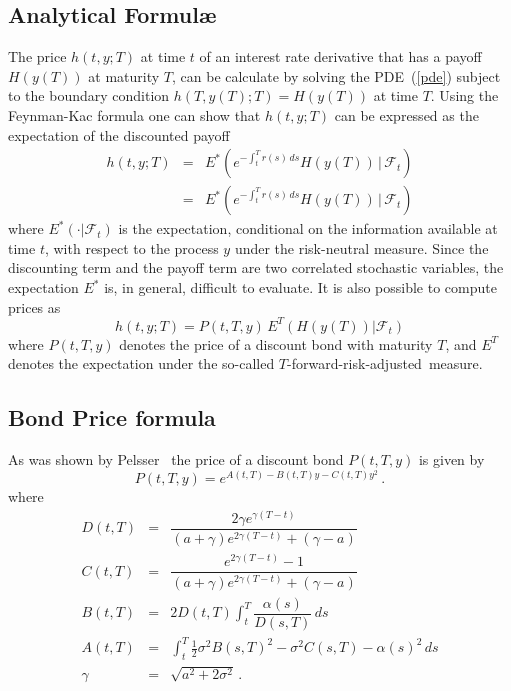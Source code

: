 \subsection{Analytical Formul\ae}
The price $h(t,y; T)$ at time $t$ of an interest rate derivative that has a payoff $H\left(y(T)\right)$ at maturity $T$, can be calculate by solving the PDE~(\ref{pde}) subject to the boundary condition $h\left(T,y(T); T\right) = H\left(y(T)\right)$ at time $T$. Using the Feynman-Kac formula one can show that $h(t,y; T)$ can be expressed as the expectation of the discounted payoff
\begin{eqnarray}
h(t,y; T) & = & \displaystyle E^* \left( e^{\displaystyle{-\int_{t}^{T} r(s) \, ds}} H\left(y(T)\right) \, \Bigg| \, \mathcal{F}_t \right) \nonumber \\
          & = & \displaystyle E^* \left( e^{\displaystyle{-\int_{t}^{T} r(s) \, ds}} H\left(y(T)\right) \, \Bigg| \, \mathcal{F}_t \right)
\end{eqnarray}
where $E^*(\cdot | \mathcal{F}_t)$ is the expectation, conditional on the information available at time $t$, with respect to the process $y$ under the risk-neutral measure. Since the discounting term and the payoff term are two correlated stochastic variables, the expectation $E^*$ is, in general, difficult to evaluate. It is also possible to compute prices as
\begin{equation}
h(t,y; T) = P(t,T,y)\, E^T\left(H(y(T))|\mathcal{F}_t \right)
\end{equation}
where $P(t,T,y)$ denotes the price of a discount bond with maturity $T$, and $E^T$ denotes the expectation under the so-called $T$-forward-risk-adjusted~measure.


\subsection{Bond Price formula}
As was shown by Pelsser~\cite{BookPelsser} the price of a discount bond $P(t,T,y)$ is given by
\begin{equation}
P(t,T,y) = \displaystyle{e}^{\displaystyle{A(t,T) - B(t,T) y - C(t,T) y^2 }} \, .
\end{equation}
where
\begin{eqnarray}
D(t,T) & = & \dfrac{2\gamma e^{\gamma(T-t)}}{(a+\gamma)e^{2\gamma(T-t)}+(\gamma - a)} \nonumber \\
C(t,T) & = & \dfrac{e^{2\gamma(T-t)}-1}{(a+\gamma)e^{2\gamma(T-t)}+(\gamma - a)} \nonumber \\
B(t,T) & = & 2 D(t,T) \displaystyle{ \int_t^T \dfrac{\alpha(s)}{D(s,T)} \, ds }\nonumber \\
A(t,T) & = & \displaystyle{\int_t^T \frac{1}{2}\sigma^2 B(s,T)^2 - \sigma^2 C(s,T) - \alpha(s)^2 \, ds  } \nonumber \\
\gamma & = & \sqrt{a^2+2\sigma^2} \, .
\end{eqnarray}

